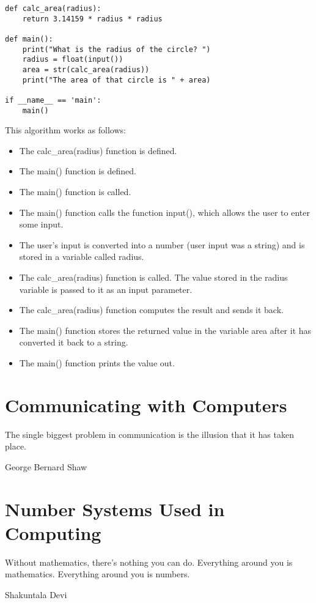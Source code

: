 \documentclass[11pt,fleqn]{book} %
\begin{document}
\begin{verbatim}
def calc_area(radius):
    return 3.14159 * radius * radius

def main():
    print("What is the radius of the circle? ")
    radius = float(input())
    area = str(calc_area(radius))
    print("The area of that circle is " + area)

if __name__ == 'main':
    main()

\end{verbatim} 

This algorithm works as follows:

\begin{itemize}
\item The calc\_area(radius) function is defined.
\item The main() function is defined.
\item The main() function is called.
\item The main() function calls the function input(), which allows the user to enter some input.
\item The user's input is converted into a number (user input was a string) and is stored in a variable called radius.
\item The calc\_area(radius) function is called.  The value stored in the radius variable is passed to it as an input parameter.
\item The calc\_area(radius) function computes the result and sends it back.
\item The main() function stores the returned value in the variable area after it has converted it back to a string.
\item The main() function prints the value out.
\end{itemize}



\chapter{Communicating with Computers}

\epigraph{The single biggest problem in communication is the illusion that it has taken place.}{George Bernard Shaw}

\chapter{Number Systems Used in Computing}

\epigraph{Without mathematics, there's nothing you can do. Everything around you is mathematics. Everything around you is numbers.}{Shakuntala Devi}
\end{document}
